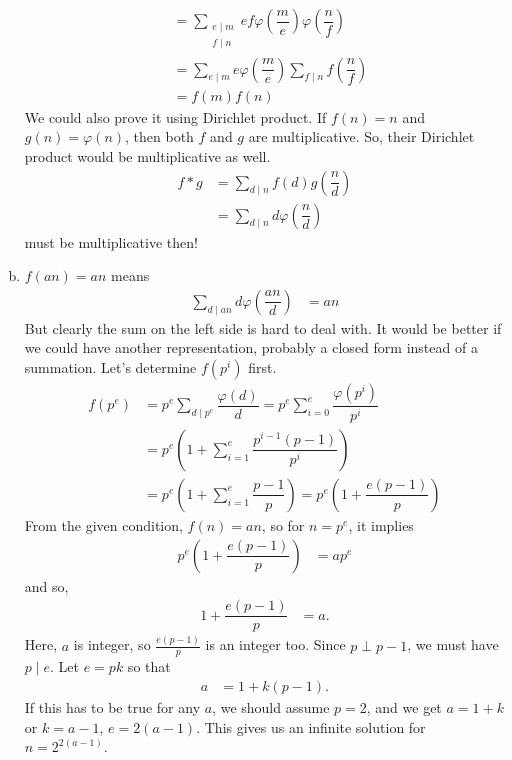 \documentclass[problems.tex]{subfile}
\begin{document}
\begin{solution}
\begin{enumerate}[(a)]
\begin{align*}
								  & = \sum_{\substack{e\mid m\\f\mid n}}ef\varphi\left(\dfrac{m}{e}\right)\varphi\left(\dfrac{n}{f}\right)\\
								  & = \sum_{e\mid m}e\varphi\left(\dfrac{m}{e}\right)\sum_{f\mid n}f\left(\dfrac{n}{f}\right)\\
								  & = f(m)f(n)
						\end{align*}
					We could also prove it using Dirichlet product. If $f(n)=n$ and $g(n)=\varphi(n)$, then both $f$ and $g$ are multiplicative. So, their Dirichlet product would be multiplicative as well.
						\begin{align*}
							f\ast g & = \sum_{d\mid n}f(d)g\left(\dfrac{n}{d}\right)\\
									& = \sum_{d\mid n}d\varphi\left(\dfrac{n}{d}\right)
						\end{align*}
					must be multiplicative then!
				\item $f(an)=an$ means
						\begin{align*}
							\sum_{d\mid an}d\varphi\left(\dfrac{an}{d}\right) & = an
						\end{align*}
					But clearly the sum on the left side is hard to deal with. It would be better if we could have another representation, probably a closed form instead of a summation. Let's determine $f(p^i)$ first.
						\begin{align*}
							f(p^e)  & = p^e\sum_{d\mid p^e}\dfrac{\varphi(d)}{d} = p^e\sum_{i=0}^{e}\dfrac{\varphi(p^i)}{p^i}\\
									& = p^e\left(1+\sum_{i=1}^{e}\dfrac{p^{i-1}(p-1)}{p^i}\right)\\
									& = p^e\left(1+\sum_{i=1}^{e}\dfrac{p-1}{p}\right)= p^e\left(1+\dfrac{e(p-1)}{p}\right)
						\end{align*}
					From the given condition, $f(n) = an$, so for $n=p^e$, it implies
						\begin{align*}
							p^e\left(1+\dfrac{e(p-1)}{p}\right) & = ap^e
						\end{align*}
					and so,
						\begin{align*}
							1+\dfrac{e(p-1)}{p} & = a.
						\end{align*}
					Here, $a$ is integer, so $\frac{e(p-1)}{p}$ is an integer too. Since $p\perp p-1$, we must have $p\mid e$. Let $e=pk$ so that
						\begin{align*}
							a & = 1+k(p-1).
						\end{align*}
					If this has to be true for any $a$, we should assume $p=2$, and we get $a=1+k$ or $k=a-1$, $e=2(a-1)$. This gives us an infinite solution for $n=2^{2(a-1)}$.
			\end{enumerate}
	\end{solution}
\end{document}
